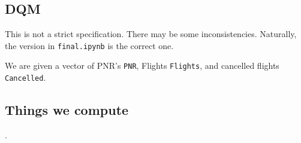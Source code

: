\documentclass{article}
\let\vec\mathbf
\providecommand{\brak}[1]{\ensuremath{\left(#1\right)}}
\providecommand{\cbrak}[1]{\ensuremath{\left\{#1\right\}}}
\providecommand{\sbrak}[1]{\ensuremath{\left[#1\right]}}
\begin{document}
\begin{flushleft}




\section{DQM}


This is not a strict specification. There may be some inconsistencies. Naturally, the version in \texttt{final.ipynb} is the correct one.

We are given a vector of PNR's \texttt{PNR}, Flights \texttt{Flights}, and cancelled flights \texttt{Cancelled}. %

\subsection{Things we compute}.


\end{flushleft}
\end{document}
